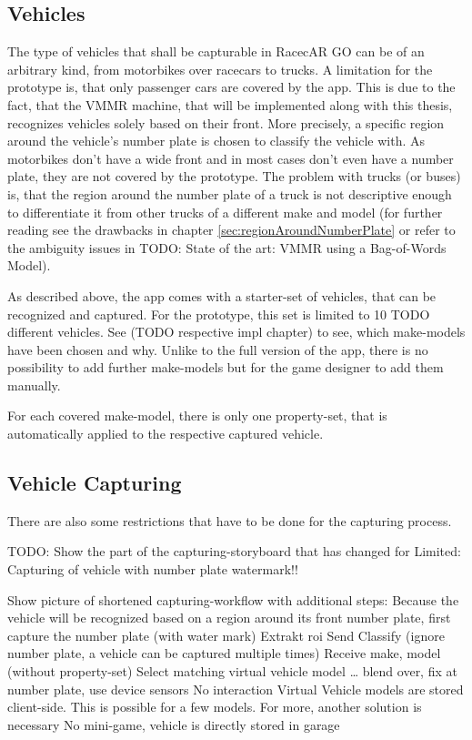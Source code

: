 \subsection{Vehicles}
The type of vehicles that shall be capturable in RacecAR GO can be of an arbitrary kind, from motorbikes over racecars to trucks. A limitation for the prototype is, that only passenger cars are covered by the app. This is due to the fact, that the VMMR machine, that will be implemented along with this thesis, recognizes vehicles solely based on their front. More precisely, a specific region around the vehicle's number plate is chosen to classify the vehicle with. As motorbikes don't have a wide front and in most cases don't even have a number plate, they are not covered by the prototype. The problem with trucks (or buses) is, that the region around the number plate of a truck is not descriptive enough to differentiate it from other trucks of a different make and model (for further reading see the drawbacks in chapter \ref{sec:regionAroundNumberPlate} or refer to the ambiguity issues in TODO: State of the art: VMMR using a Bag-of-Words Model).

As described above, the app comes with a starter-set of vehicles, that can be recognized and captured. For the prototype, this set is limited to 10 TODO different vehicles. See (TODO respective impl chapter) to see, which make-models have been chosen and why. Unlike to the full version of the app, there is no possibility to add further make-models but for the game designer to add them manually.

For each covered make-model, there is only one property-set, that is automatically applied to the respective captured vehicle.

\subsection{Vehicle Capturing}
There are also some restrictions that have to be done for the capturing process.

TODO: Show the part of the capturing-storyboard that has changed for Limited: Capturing of vehicle with number plate watermark!!

Show picture of shortened capturing-workflow with additional steps:
Because the vehicle will be recognized based on a region around its front number plate, first capture the number plate (with water mark)
Extrakt roi
Send
Classify (ignore number plate, a vehicle can be captured multiple times)
Receive make, model (without property-set)
Select matching virtual vehicle model
… blend over, fix at number plate, use device sensors
No interaction
Virtual Vehicle models are stored client-side. This is possible for a few models. For more, another solution is necessary
No mini-game, vehicle is directly stored in garage


